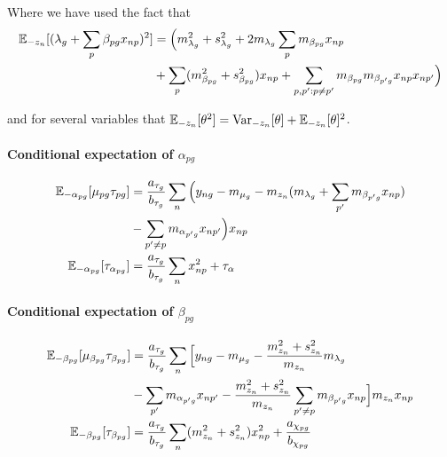 Where we have used the fact that
\begin{equation}
  \begin{aligned}
\mathbb{E}_{-z_n}[(\lambda_g + \sum_p \beta_{pg} x_{np})^2] & =  \Big(m_{\lambda_g}^2 + s_{\lambda_g}^2 + 2m_{\lambda_g} \sum_p m_{\beta_{pg}} x_{np} \\
& +
 \sum_p (m_{\beta_{pg}}^2 + s_{\beta_{pg}}^2) x_{np} +
 \sum_{p,p': p \neq p'} m_{\beta_{pg}} m_{\beta_{p'g}} x_{np}x_{np'}
\Big)
\end{aligned}
\end{equation}

and for several variables that $\mathbb{E}_{-z_n}[\theta^2] = \text{Var}_{-z_n}[\theta] + \mathbb{E}_{-z_n}[\theta]^2$.

\paragraph{Conditional expectation of $\alpha_{pg}$}
\begin{equation}
\begin{aligned}
\mathbb{E}_{-\alpha_{pg}}[\mu_{pg} \tau_{pg}] & =
\frac{a_{\tau_g}}{b_{\tau_g}} \sum_n \Big (
y_{ng} - m_{\mu_g} - m_{z_n}( m_{\lambda_g} + \sum_{p'} m_{\beta_{p'g}} x_{np} ) \\
& - \sum_{p' \neq p} m_{\alpha_{p'g}} x_{np'}
\Big) x_{np} \\
\mathbb{E}_{-\alpha_{pg}}[\tau_{\alpha_{pg}}] & =
\frac{a_{\tau_g}}{b_{\tau_g}} \sum_n x_{np}^2 + \tau_\alpha
\end{aligned}
\end{equation}

\paragraph{Conditional expectation of $\beta_{pg}$}
\begin{equation}
\begin{aligned}
\mathbb{E}_{-\beta_{pg}}[\mu_{\beta_{pg}} \tau_{\beta_{pg}}] & =
\frac{a_{\tau_g}}{b_{\tau_g}} \sum_n \Big[
y_{ng} - m_{\mu_g} - \frac{m_{z_n}^2 + s_{z_n}^2}{m_{z_n}} m_{\lambda_g} \\
& - \sum_{p'} m_{\alpha_{p'g}} x_{np'}
- \frac{m_{z_n}^2 + s_{z_n}^2}{m_{z_n}} \sum_{p' \neq p} m_{\beta_{p'g}} x_{np}
\Big] m_{z_n} x_{np} \\
\mathbb{E}_{-\beta_{pg}} [ \tau_{\beta_{pg}} ] & =
\frac{a_{\tau_g}}{b_{\tau_g}} \sum_n (m_{z_n}^2 + s_{z_n}^2) x_{np}^2 +
\frac{a_{\chi_{pg}}}{b_{\chi_{pg}}}
\end{aligned}
\end{equation}

